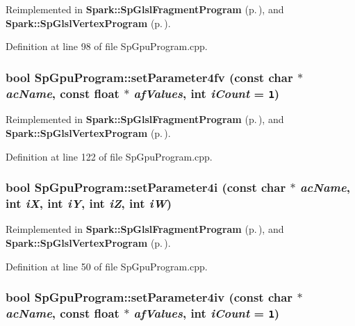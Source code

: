 Reimplemented in {\bf Spark::Sp\-Glsl\-Fragment\-Program} {\rm (p.\,\pageref{classSpark_1_1SpGlslFragmentProgram_a12})}, and {\bf Spark::Sp\-Glsl\-Vertex\-Program} {\rm (p.\,\pageref{classSpark_1_1SpGlslVertexProgram_a12})}.

Definition at line 98 of file Sp\-Gpu\-Program.cpp.
\subsubsection{\setlength{\rightskip}{0pt plus 5cm}bool Sp\-Gpu\-Program::set\-Parameter4fv (const char $\ast$ {\em ac\-Name}, const float $\ast$ {\em af\-Values}, int {\em i\-Count} = {\tt 1})\hspace{0.3cm}{\tt  [virtual]}}\label{classSpark_1_1SpGpuProgram_a27}




Reimplemented in {\bf Spark::Sp\-Glsl\-Fragment\-Program} {\rm (p.\,\pageref{classSpark_1_1SpGlslFragmentProgram_a16})}, and {\bf Spark::Sp\-Glsl\-Vertex\-Program} {\rm (p.\,\pageref{classSpark_1_1SpGlslVertexProgram_a16})}.

Definition at line 122 of file Sp\-Gpu\-Program.cpp.
\subsubsection{\setlength{\rightskip}{0pt plus 5cm}bool Sp\-Gpu\-Program::set\-Parameter4i (const char $\ast$ {\em ac\-Name}, int {\em i\-X}, int {\em i\-Y}, int {\em i\-Z}, int {\em i\-W})\hspace{0.3cm}{\tt  [virtual]}}\label{classSpark_1_1SpGpuProgram_a15}




Reimplemented in {\bf Spark::Sp\-Glsl\-Fragment\-Program} {\rm (p.\,\pageref{classSpark_1_1SpGlslFragmentProgram_a4})}, and {\bf Spark::Sp\-Glsl\-Vertex\-Program} {\rm (p.\,\pageref{classSpark_1_1SpGlslVertexProgram_a4})}.

Definition at line 50 of file Sp\-Gpu\-Program.cpp.
\subsubsection{\setlength{\rightskip}{0pt plus 5cm}bool Sp\-Gpu\-Program::set\-Parameter4iv (const char $\ast$ {\em ac\-Name}, const float $\ast$ {\em af\-Values}, int {\em i\-Count} = {\tt 1})\hspace{0.3cm}{\tt  [virtual]}}\label{classSpark_1_1SpGpuProgram_a19}


